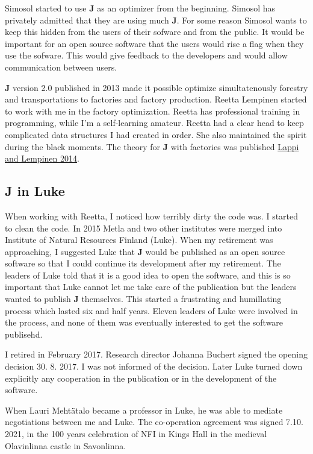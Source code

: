 Simosol started to use \textbf{J} as an 
optimizer from the beginning. Simosol has privately admitted 
that they are using much \textbf{J}. 
For some reason Simosol 
wants to keep this hidden from the users of their sofware and from the public. 
It would be important for an open source software that 
the users would rise a flag when they use the sofware. 
This would give feedback to the developers 
and would allow communication between users. 
 
\textbf{J} version 2.0 published in 2013 made it possible optimize simultatenously 
forestry and transportations to factories 
and factory production. 
Reetta Lempinen started to work with me in the factory optimization. 
Reetta has professional 
training in programming, while I'm a self-learning amateur. 
Reetta had a clear head to keep complicated data structures I had created in order. 
She also maintained the spirit during the black moments. The theory for \textbf{J} with factories was published 
\href{run:./lappilempinen.pdf}{Lappi and Lempinen 2014}. 
 
 
\subsection*{J in Luke} 
When working with Reetta, I noticed how terribly dirty the code was. I started to clean the 
code. 
In 2015 Metla and 
two other institutes were merged into Institute of Natural Resources Finland (Luke). 
When my retirement was approaching, I suggested Luke that \textbf{J} would be published as 
an open source software so that I could continue its development after my retirement. 
The leaders of Luke told that it is a good idea to open the software, and this is so important that 
Luke cannot let me take care of the publication but the leaders wanted to publish \textbf{J} 
themselves. This started a frustrating and humillating process which lasted six 
and half years. Eleven 
leaders of Luke were involved in the process, 
and none of them was eventually interested to get the software publisehd. 
 
I retired in February 2017.  Research director Johanna Buchert signed the opening decision 30. 8. 2017. 
I was not informed of the decision. Later Luke turned down explicitly any cooperation 
in the publication or in the development of 
the software. 
 
When Lauri Mehtätalo became a professor in Luke, he was able to mediate negotiations between me and Luke. 
The co-operation agreement was signed 7.10. 2021, in the 100 years celebration of NFI in  Kings Hall 
in the medieval Olavinlinna castle in Savonlinna. 
 
